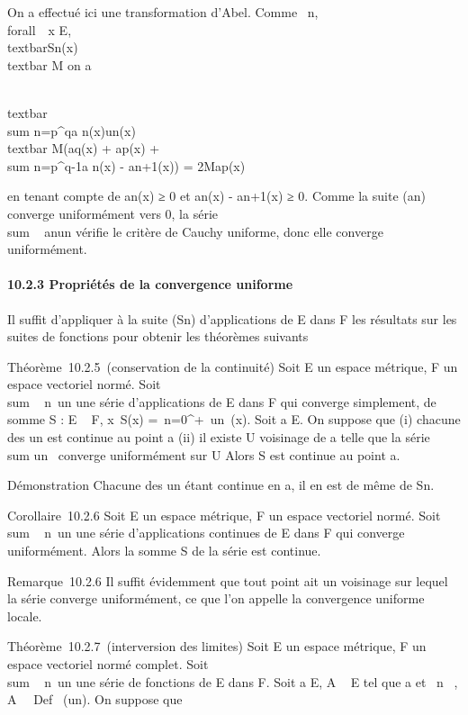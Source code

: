 On a effectué ici une transformation d'Abel. Comme
\forall~n, \\forall~~x \in E,
\\textbar{}Sn(x)\\textbar{} \leq M
on a

\\textbar{}\\sum
n=p^qa
n(x)un(x)\\textbar{} \leq
M(\textbar{}aq(x)\textbar{} +
\textbar{}ap(x)\textbar{} + \\sum
n=p^q-1\textbar{}a n(x) -
an+1(x)\textbar{}) = 2Map(x)

en tenant compte de an(x) ≥ 0 et an(x) -
an+1(x) ≥ 0. Comme la suite (an) converge
uniformément vers 0, la série
\\sum ~
anun vérifie le critère de Cauchy uniforme, donc
elle converge uniformément.

\paragraph{10.2.3 Propriétés de la convergence uniforme}

Il suffit d'appliquer à la suite (Sn) d'applications de E dans
F les résultats sur les suites de fonctions pour obtenir les théorèmes
suivants

Théorème~10.2.5~(conservation de la continuité) Soit E un espace
métrique, F un espace vectoriel normé. Soit
\\sum ~
n\in{}~un une série d'applications de E dans F qui
converge simplement, de somme S : E \rightarrow~ F,
x\mapsto~S(x) =\
\sum  n=0^+\infty~un~(x).
Soit a \in E. On suppose que (i) chacune des un est continue au
point a (ii) il existe U voisinage de a telle que la série
\\sum  un~
converge uniformément sur U Alors S est continue au point a.

Démonstration Chacune des un étant continue en a, il en est de
même de Sn.

Corollaire~10.2.6 Soit E un espace métrique, F un espace vectoriel
normé. Soit \\sum ~
n\in{}~un une série d'applications continues de E dans F
qui converge uniformément. Alors la somme S de la série est continue.

Remarque~10.2.6 Il suffit évidemment que tout point ait un voisinage sur
lequel la série converge uniformément, ce que l'on appelle la
convergence uniforme locale.

Théorème~10.2.7~(interversion des limites) Soit E un espace métrique, F
un espace vectoriel normé complet. Soit
\\sum ~
n\in{}~un une série de fonctions de E dans F. Soit a \in E,
A \subset~ E tel que a \in\overlineA et
\forall~n \in {}~, A \subset~\ Def~
(un). On suppose que

